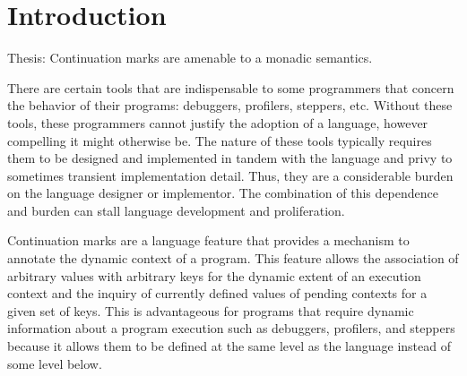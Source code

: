 \documentclass[ms]{byuprop}
\title{\Title}
\author{\Author}
\begin{document}
\maketitle



\section{Introduction}


Thesis: Continuation marks are amenable to a monadic semantics.


There are certain tools that are indispensable to some programmers that concern the
behavior of their programs: debuggers, profilers, steppers, etc. Without these tools,
these programmers cannot justify the adoption of a language, however compelling it might
otherwise be. The nature of these tools typically requires them to be designed and
implemented in tandem with the language and privy to sometimes transient implementation
detail. Thus, they are a considerable burden on the language designer or implementor. The
combination of this dependence and burden can stall language development and proliferation.

Continuation marks \cite{clements2006portable} are a language feature that provides a
mechanism to annotate the dynamic context of a program. This feature allows the
association of arbitrary values with arbitrary keys for the dynamic extent of an execution
context and the inquiry of currently defined values of pending contexts for a given set of
keys. This is advantageous for programs that require dynamic information about a program
execution such as debuggers, profilers, and steppers because it allows them to be defined
at the same level as the language instead of some level below.


\end{document}
